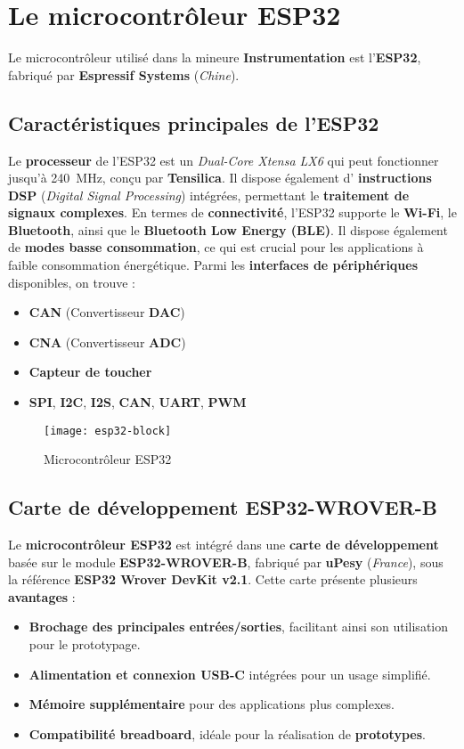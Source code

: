 \section{Le microcontrôleur ESP32}

Le microcontrôleur utilisé dans la mineure \textbf{Instrumentation} est 
l'\textbf{ESP32}, fabriqué par \textbf{Espressif Systems} (\textit{Chine}).

\subsection{Caractéristiques principales de l'ESP32}
Le \textbf{processeur} de l'ESP32 est un \textit{Dual-Core Xtensa LX6} qui peut 
fonctionner jusqu'à \SI{240}{\mega\hertz}, conçu par \textbf{Tensilica}. Il
dispose également d' \textbf{instructions DSP} (\textit{Digital Signal Processing}) 
intégrées, permettant le \textbf{traitement de signaux complexes}. En termes de 
\textbf{connectivité}, l'ESP32 supporte le \textbf{Wi-Fi}, le \textbf{Bluetooth}, 
ainsi que le \textbf{Bluetooth Low Energy (BLE)}. Il dispose également de 
\textbf{modes basse consommation}, ce qui est crucial pour les applications à 
faible consommation énergétique. Parmi les \textbf{interfaces de périphériques} 
disponibles, on trouve :
\begin{itemize}
    \item \textbf{CAN} (Convertisseur \textbf{DAC})
    \item \textbf{CNA} (Convertisseur \textbf{ADC})
    \item \textbf{Capteur de toucher}
    \item \textbf{SPI}, \textbf{I2C}, \textbf{I2S}, \textbf{CAN}, \textbf{UART}, \textbf{PWM}
\end{itemize}

\begin{figure}[!ht]
    \centering
    \texttt{[image: esp32-block]}
    \caption{Microcontrôleur ESP32}
    \label{fig:esp32}
\end{figure}

\subsection{Carte de développement ESP32-WROVER-B}
Le \textbf{microcontrôleur ESP32} est intégré dans une
 \textbf{carte de développement} basée sur le module \textbf{ESP32-WROVER-B}, 
 fabriqué par \textbf{uPesy} (\textit{France}), sous la référence 
 \textbf{ESP32 Wrover DevKit v2.1}. Cette carte présente plusieurs 
 \textbf{avantages} :
\begin{itemize}
    \item \textbf{Brochage des principales entrées/sorties}, facilitant ainsi son utilisation pour le prototypage.
    \item \textbf{Alimentation et connexion USB-C} intégrées pour un usage simplifié.
    \item \textbf{Mémoire supplémentaire} pour des applications plus complexes.
    \item \textbf{Compatibilité breadboard}, idéale pour la réalisation de \textbf{prototypes}.
\end{itemize}


